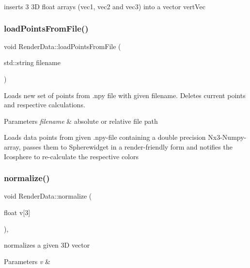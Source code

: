 inserts 3 3D float arrays (vec1, vec2 and vec3) into a vector vert\+Vec \mbox{\label{class_render_data_ac161f29f7d6ae6fd3912e8af7bdccdfd}} 
\subsubsection{\texorpdfstring{load\+Points\+From\+File()}{loadPointsFromFile()}}
{\footnotesize\ttfamily void Render\+Data\+::load\+Points\+From\+File (\begin{DoxyParamCaption}\item[{std\+::string}]{filename }\end{DoxyParamCaption})}

Loads new set of points from .npy file with given filename. Deletes current points and respective calculations. 
\begin{DoxyParams}{Parameters}
{\em filename} & absolute or relative file path\\
\hline
\end{DoxyParams}
Loads data points from given .npy-\/file containing a double precision Nx3-\/\+Numpy-\/array, passes them to Spherewidget in a render-\/friendly form and notifies the Icosphere to re-\/calculate the respective colors \mbox{\label{class_render_data_ad8c590fd11eda06875112a74d318267f}} 
\subsubsection{\texorpdfstring{normalize()}{normalize()}}
{\footnotesize\ttfamily void Render\+Data\+::normalize (\begin{DoxyParamCaption}\item[{float}]{v\mbox{[}3\mbox{]} }\end{DoxyParamCaption})\hspace{0.3cm}{\ttfamily [inline]}, {\ttfamily [private]}}

normalizes a given 3D vector 
\begin{DoxyParams}{Parameters}
{\em v} & \\
\hline
\end{DoxyParams}
\mbox{\label{class_render_data_a7b32e615d46ac5ffbd3d14de0da2c406}} 
